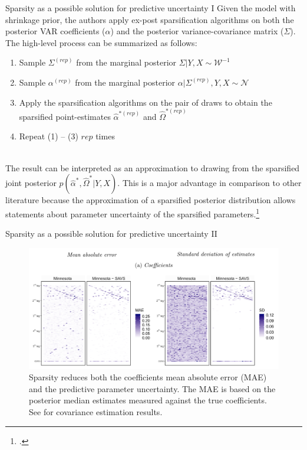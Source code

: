 \begin{frame}{Sparsity as a possible solution for predictive uncertainty I}
    Given the model with shrinkage prior, the authors apply ex-post sparsification algorithms on both the posterior VAR coefficients ($\alpha$) and the posterior variance-covariance matrix ($\Sigma$). The high-level process can be summarized as follows:
    
    \begin{enumerate}
        \item Sample $\Sigma^{(rep)}$ from the marginal posterior $\Sigma | Y,X \sim \mathcal{W}^{-1}$
        \item Sample $\alpha^{(rep)}$ from the marginal posterior $\alpha | \Sigma^{(rep)},Y,X \sim \mathcal{N}$
        \item Apply the sparsification algorithms on the pair of draws to obtain the sparsified point-estimates $\hat{\alpha}^{*(rep)}$ and $\hat{\Omega}^{*(rep)}$
        \item Repeat (1) – (3) $rep$ times
    \end{enumerate}
    ~\\
    The result can be interpreted as an approximation to drawing from the sparsified joint posterior $p(\hat{\alpha}^* , \hat{\Omega}^* | Y,X)$. This is a major advantage in comparison to other literature because the approximation of a sparsified posterior distribution allows statements about parameter uncertainty of the sparsified parameters.\footcite{hahn_decoupling_2015}
\end{frame}

\begin{frame}{Sparsity as a possible solution for predictive uncertainty II}
    \begin{figure}
        \centering
        \includegraphics[width=1\textwidth]{plots/sparsity_coefficients.png}
        \caption{Sparsity reduces both the coefficients mean absolute error (MAE) and the predictive parameter uncertainty. The MAE is based on the posterior median estimates measured against the true coefficients. See  for covariance estimation results.}
        \label{fig:dense_vs_sparse_coefficients}
    \end{figure}
\end{frame}

